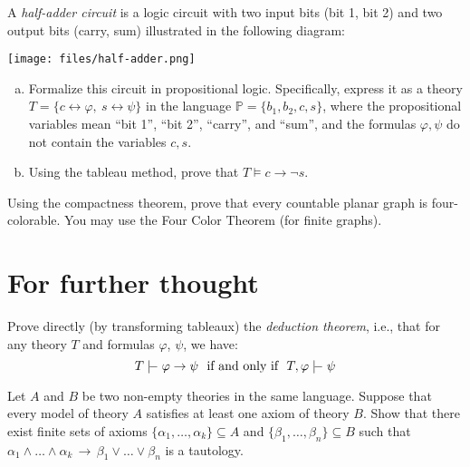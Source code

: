\begin{problem}

    A \emph{half-adder circuit} is a logic circuit with two input bits (bit 1, bit 2) and two output bits (carry, sum) illustrated in the following diagram:
    \begin{center}
        \texttt{[image: files/half-adder.png]}
    \end{center}
    \begin{enumerate}[(a)]
            \item Formalize this circuit in propositional logic. Specifically, express it as a theory $T=\{c\leftrightarrow \varphi,\ s\leftrightarrow \psi\}$ in the language $\mathbb P=\{b_1,b_2,c,s\}$, where the propositional variables mean ``bit 1'', ``bit 2'', ``carry'', and ``sum'', and the formulas $\varphi,\psi$ do not contain the variables $c,s$.
            \item Using the tableau method, prove that $T\models c\to\neg s$.
    \end{enumerate}

\end{problem}


\begin{problem}

    Using the compactness theorem, prove that every countable planar graph is four-colorable. You may use the Four Color Theorem (for finite graphs).

\end{problem}


        
\section*{For further thought}
        
        
\begin{problem}

    Prove directly (by transforming tableaux) the \emph{deduction theorem}, i.e., that for any theory $T$ and formulas $\varphi$, $\psi$, we have:
    $$
    T \proves \varphi\to\psi\text{\ \ if and only if\ \ }T,\varphi\proves  \psi
    $$

\end{problem}


\begin{problem}
    Let $A$ and $B$ be two non-empty theories in the same language. Suppose that every model of theory $A$ satisfies at least one axiom of theory $B$. Show that there exist finite sets of axioms $\{\alpha_1,\dots,\alpha_k\}\subseteq A$ and $\{\beta_1,\dots,\beta_n\}\subseteq B$ such that $\alpha_1\wedge\dots\wedge\alpha_k\,\to\,\beta_1\vee\dots\vee\beta_n$ is a tautology.
\end{problem}

